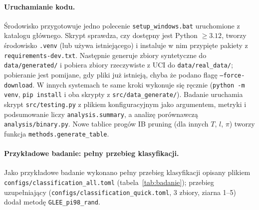 \documentclass{article}
\newcommand{\code}[1]{\texttt{#1}}
\begin{document}
\paragraph{Uruchamianie kodu.}
Środowisko przygotowuje jedno polecenie \code{setup\_windows.bat} uruchomione z katalogu
głównego. Skrypt sprawdza, czy dostępny jest Python $\ge 3.12$, tworzy środowisko
\code{.venv} (lub używa istniejącego) i instaluje w nim przypięte pakiety z
\code{requirements-dev.txt}. Następnie generuje zbiory syntetyczne do
\code{data/generated/} i pobiera zbiory rzeczywiste z UCI do \code{data/real\_data/};
pobieranie jest pomijane, gdy pliki już istnieją, chyba że podano flagę
\code{--force-download}. W innych systemach te same kroki wykonuje się ręcznie
(\code{python -m venv}, \code{pip install} i oba skrypty z \code{src/data\_generate/}).
Badanie uruchamia skrypt \code{src/testing.py} z plikiem konfiguracyjnym jako argumentem,
metryki i podsumowanie liczy \code{analysis.summary}, a analizę porównawczą
\code{analysis/binary.py}. Nowe tablice progów IB pruning (dla innych $T$, $l$, $\pi$)
tworzy funkcja \code{methods.generate\_table}.

\paragraph{Przykładowe badanie: pełny przebieg klasyfikacji.}
Jako przykładowe badanie wykonano pełny przebieg klasyfikacji opisany plikiem
\code{configs/classification\_all.toml} (tabela~\ref{tab:badanie}); przebieg
uzupełniający (\code{configs/classification\_quick.toml}, 3 zbiory, ziarna 1--5) dodał
metodę \code{GLEE\_pi98\_rand}.
\end{document}
